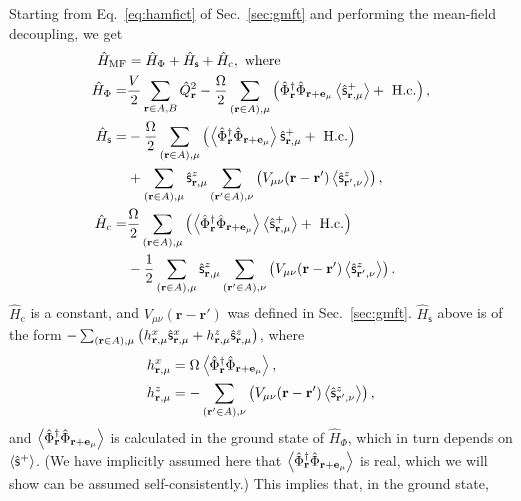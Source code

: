 \documentclass[twocolumn,superscriptaddress,amsmath,amssymb,aps,prx,nofootinbib]{revtex4-2}
\begin{document}
Starting from Eq.~\eqref{eq:hamfict} of Sec.~\ref{sec:gmft} and performing the mean-field decoupling, we get
\begin{equation}\label{eq:Hmf}
\begin{aligned}
    \hat{H}_{\text{MF}}&=\hat{H}_{\Phi}+ \hat{H}_{\mathsf{s}} + \hat{H}_{\text{c}}, \text{ where}\\
    \hat{H}_{\Phi}=&\frac{V}{2} \sum_{\vb{r}\in A,B} \hat{Q}^2_{\vb{r}}- \frac{\Omega}{2}\sum_{(\vb{r}\in A),\mu}\left(\hat{\Phi}_{\vb{r}}^\dagger \hat{\Phi}_{\vb{r}+\vb{e}_\mu} \expval{\hat{\mathsf{s}}^+_{\vb{r},\mu }}+ \text{ H.c.}\right),\\
    \hat{H}_{\mathsf{s}}=&-\frac{\Omega}{2}\sum_{(\vb{r}\in A), \mu}\left(\expval{\hat{\Phi}_{\vb{r}}^\dagger \hat{\Phi}_{\vb{r}+\vb{e}_\mu}} \hat{\mathsf{s}}^+_{\vb{r},\mu }+ \text{ H.c.}\right) \\&+ \sum_{(\vb{r}\in A), \mu} \hat{\mathsf{s}}^z_{\vb{r},\mu}\sum_{(\vb{r}'\in A), \nu}\left(V_{\mu\nu}(\vb{r}-\vb{r}')\expval{\hat{\mathsf{s}}^z_{\vb{r}',\nu}}\right),\\
    \hat{H}_{\text{c}}=&\frac{\Omega}{2}\sum_{(\vb{r}\in A),\mu}\left(\expval{\hat{\Phi}_{\vb{r}}^\dagger \hat{\Phi}_{\vb{r}+\vb{e}_\mu}}\expval{ \hat{\mathsf{s}}^+_{\vb{r},\mu }}+ \text{ H.c.}\right)\\&-\frac{1}{2}\sum_{(\vb{r}\in A), \mu} \hat{\mathsf{s}}^z_{\vb{r},\mu}\sum_{(\vb{r}'\in A), \nu}\left(V_{\mu\nu}(\vb{r}-\vb{r}')\expval{\hat{\mathsf{s}}^z_{\vb{r}',\nu}}\right).
\end{aligned}
\end{equation}
$\hat{H}_{\text{c}}$ is a constant, and $V_{\mu\nu}(\mathbf{r} - \mathbf{r'})$ was defined in Sec.~\ref{sec:gmft}. $\hat{H}_{\mathsf{s}}$ above is of the form $-\sum_{(\vb{r}\in A),\mu}\left(h^x_{\vb{r},\mu} \hat{\mathsf{s}}^x_{\vb{r},\mu}+h^z_{\vb{r},\mu} \hat{\mathsf{s}}^z_{\vb{r},\mu}\right)$, where 
\begin{equation}\label{eq:fieldexp}
    \begin{aligned}
    h^x_{\vb{r},\mu}&=\Omega \expval{\hat{\Phi}_{\vb{r}}^\dagger \hat{\Phi}_{\vb{r}+\vb{e}_\mu}},\\
    h^z_{\vb{r},\mu}&=-\sum_{(\vb{r}'\in A), \nu}\left(V_{\mu\nu}(\vb{r}-\vb{r}')\expval{\hat{\mathsf{s}}^z_{\vb{r}',\nu}}\right),
    \end{aligned}
\end{equation}
and $\expval{\hat{\Phi}_{\vb{r}}^\dagger \hat{\Phi}_{\vb{r}+\vb{e}_\mu}}$ is calculated in the ground state of $\hat{H}_{\Phi}$, which in turn depends on $\expval{\hat{\mathsf{s}}^+}$. (We have implicitly assumed here that $\expval{\hat{\Phi}_{\vb{r}}^\dagger \hat{\Phi}_{\vb{r}+\vb{e}_\mu}}$ is real, which we will show can be assumed self-consistently.) This implies that, in the ground state, 
\end{document}
